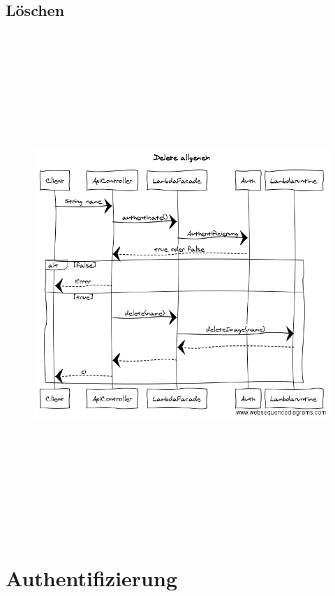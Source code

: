 \documentclass[a4paper,20pt,oneside]{book}
\begin{document}
\subsection{Löschen}
	\begin{figure}[!hb]
    \includegraphics[width=18cm,height=19cm]{Delete}
\end{figure}
\newpage
	\section{Authentifizierung}
\end{document}
